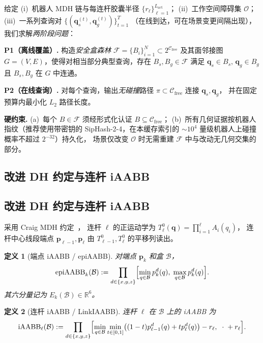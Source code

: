 \documentclass[journal]{IEEEtran}
\newtheorem{definition}{定义}
\newcommand{\iAABB}{\mathrm{iAABB}}
\newcommand{\Real}{\mathbb{R}}
\newcommand{\Cfree}{\mathcal{C}_{\mathrm{free}}}
\newcommand{\calO}{\mathcal{O}}
\begin{document}
给定 (i)~机器人 MDH 链与每连杆胶囊半径 $\{r_\ell\}_{\ell=1}^{L_\text{act}}$；
(ii)~工作空间障碍集 $\calO$；
(iii)~一系列查询对 $\{(\bm{q}_s^{(t)},\bm{q}_g^{(t)})\}_{t=1}^{T}$
（在线到达，可在场景变更间隔出现），
我们求解\emph{两阶段问题}：

\textbf{P1（离线覆盖）.}
构造\emph{安全盒森林}
$\mathcal{F}=\{B_i\}_{i=1}^{N}\subset 2^{\Cfree}$ 及其面邻接图
$G=(V,E)$，使得对相当部分典型查询，存在
$B_s,B_g\in\mathcal{F}$ 满足 $\bm{q}_s\in B_s,\,\bm{q}_g\in B_g$ 且
$B_s,B_g$ 在 $G$ 中连通。

\textbf{P2（在线查询）.}
对每个查询，输出\emph{无碰撞}路径
$\pi\subset\Cfree$ 连接 $\bm{q}_s,\bm{q}_g$，
并在固定预算内最小化 $L_2$ 路径长度。

\textbf{硬约束.} (a)~每个 $B\in\mathcal{F}$ 须经形式化认证 $B\subseteq\Cfree$；
(b)~所有几何证据按机器人指纹（推荐使用带密钥的 SipHash-2-4，在本缓存索引的 $\sim 10^4$ 量级机器人上碰撞概率不超过 $2^{-32}$）持久化，
场景仅改变 $\calO$ 时无需重建 $\mathcal{F}$ 中与改动无几何交集的部分。

\subsection{改进 DH 约定与连杆 iAABB}

\subsection{改进 DH 约定与连杆 iAABB}
\label{sec:dh}

采用 Craig MDH 约定~\cite{craig2005introduction}，
连杆 $\ell$ 的正运动学为
$T_\ell^0(\mathbf{q}) = \prod_{i=1}^{\ell} A_i(q_i)$，
连杆中心线段端点 $\bm{p}_{\ell-1},\bm{p}_\ell$ 由
$T_{\ell-1}^0,T_\ell^0$ 的平移列读出。

\begin{definition}[端点 iAABB / epiAABB]\label{def:epiaabb}
对端点 $\bm{p}_k$ 和盒 $\mathcal{B}$，
\begin{equation}
\mathrm{epiAABB}_k(\mathcal{B})
 :=\prod_{d\in\{x,y,z\}}
\Bigl[\min_{q\in\mathcal{B}} p_k^d(q),\;
\max_{q\in\mathcal{B}} p_k^d(q)\Bigr].
\end{equation}
其六分量记为 $E_k(\mathcal{B})\in\Real^6$。
\end{definition}

\begin{definition}[连杆 iAABB / LinkIAABB]\label{def:iaabb}
连杆 $\ell$ 在 $\mathcal{B}$ 上的 iAABB 为
\begin{equation}\label{eq:linkiaabb_def}
\iAABB_\ell(\mathcal{B})
:=\prod_{d\in\{x,y,z\}}
\Bigl[\min_{q\in\mathcal{B}}\min_{t\in[0,1]}
\bigl((1-t)p_{\ell-1}^d(q)+tp_\ell^d(q)\bigr) - r_\ell,\;
\;\cdot\;+r_\ell\Bigr].
\end{equation}
\end{definition}
\end{document}
